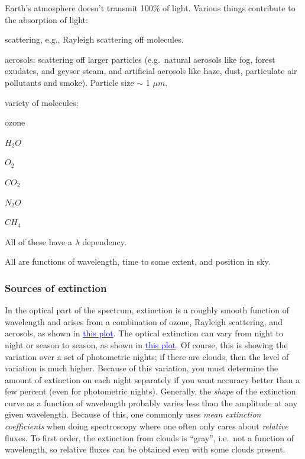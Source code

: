 \documentclass[12pt]{article}
\begin{document}
Earth's atmosphere doesn't transmit 100\% of light. Various things
contribute to the absorption of light:
\begin{itemize*}
    \item scattering, e.g., Rayleigh scattering off molecules.
    \item aerosols: scattering off larger particles (e.g.\ natural
    aerosols like fog, forest exudates, and geyser steam, and
    artificial aerosols like haze, dust, particulate air pollutants
    and smoke). Particle size $\sim$ 1 $\mu m$.
    \item variety of molecules:
    \begin{itemize*}
        \item ozone
        \item $H_2O$
        \item $O_2$
        \item $CO_2$
        \item $N_2O$
        \item $CH_4$
    \end{itemize*}
    All of these have a $\lambda$ dependency.
\end{itemize*}
All are functions of wavelength, time to some extent, and position in
sky.

\subsubsection*{Sources of extinction}
In the optical part of the spectrum, extinction is a roughly smooth
function of wavelength and arises from a combination of ozone,
Rayleigh scattering, and aerosols, as shown in
\href{http://astronomy.nmsu.edu/holtz/a535/html/diagrams/a535/extinct.htm}
{\textcolor{blue}{this plot}}.
The optical extinction can vary from night to night
or season to season, as shown in
\href{http://astronomy.nmsu.edu/holtz/a535/html/diagrams/a535/tauvar.htm}
{\textcolor{blue}{this plot}}.
Of course, this is showing the variation over a set of
photometric nights; if there are clouds, then the level of variation
is much higher. Because of this variation, you must determine the
amount of extinction on each night separately if you want accuracy
better than a few percent (even for photometric nights). Generally,
the \emph{shape} of the extinction curve as a function of wavelength probably
varies less than the amplitude at any given wavelength. Because of
this, one commonly uses \emph{mean extinction coefficients} when doing
spectroscopy where one often only cares about \emph{relative} fluxes. To
first order, the extinction from clouds is ``gray'', i.e.\ not a
function of wavelength, so relative fluxes can be obtained even with
some clouds present.
\end{document}
